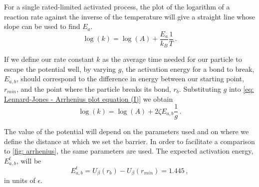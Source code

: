 \documentclass[../../main.tex]{subfiles}
\begin{document}
    For a single rated-limited activated process, the plot of the logarithm of a reaction rate against the inverse of the temperature will give a straight line whose slope can be used to find $E_a$.
        \begin{equation}\label{eq: Lennard-Jones - Arrhenius plot equation (I)}
            \log(k) = \log(A) + \frac{E_a}{k_B}\frac{1}{T} \,.
        \end{equation}
    
    If we define our rate constant $k$ as the average time needed for our particle to escape the potential well, by varying $g$, the activation energy for a bond to break, $E_{a,b}$, should correspond to the difference in energy between our starting point, $r_{min}$, and the point where the particle breaks its bond, $r_b$. Substituting $g$ into \cref{eq: Lennard-Jones - Arrhenius plot equation (I)} we obtain
        \begin{equation}\label{eq: Lennard-Jones - Arrhenius plot equation (II)}
            \log(k) = \log(A) + 2\zeta E_{a,b}\frac{1}{g} \,.
        \end{equation}
        
    The value of the potential will depend on the parameters used and on where we define the distance at which we set the barrier. In order to facilitate a comparison to \cref{fig: arrhenius}, the same parameters are used. The expected activation energy, $E_{a, b}^t$, will be
        \begin{equation}\label{eq: Lennard-Jones - Arrhenius plot equation (value)}
            E_{a,b}^t = U_{\beta}(r_b) - U_{\beta}(r_{min}) = 1.445 \,,
        \end{equation}
    in units of $\epsilon$.
    
\end{document}
